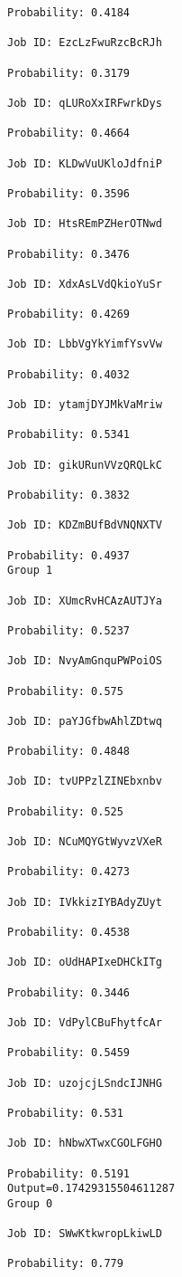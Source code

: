\documentclass[11pt]{article}
\begin{document}
\begin{Verbatim}[commandchars=\\\{\}]
Probability: 0.4184

Job ID: EzcLzFwuRzcBcRJh

Probability: 0.3179

Job ID: qLURoXxIRFwrkDys

Probability: 0.4664

Job ID: KLDwVuUKloJdfniP

Probability: 0.3596

Job ID: HtsREmPZHerOTNwd

Probability: 0.3476

Job ID: XdxAsLVdQkioYuSr

Probability: 0.4269

Job ID: LbbVgYkYimfYsvVw

Probability: 0.4032

Job ID: ytamjDYJMkVaMriw

Probability: 0.5341

Job ID: gikURunVVzQRQLkC

Probability: 0.3832

Job ID: KDZmBUfBdVNQNXTV

Probability: 0.4937
Group 1

Job ID: XUmcRvHCAzAUTJYa

Probability: 0.5237

Job ID: NvyAmGnquPWPoiOS

Probability: 0.575

Job ID: paYJGfbwAhlZDtwq

Probability: 0.4848

Job ID: tvUPPzlZINEbxnbv

Probability: 0.525

Job ID: NCuMQYGtWyvzVXeR

Probability: 0.4273

Job ID: IVkkizIYBAdyZUyt

Probability: 0.4538

Job ID: oUdHAPIxeDHCkITg

Probability: 0.3446

Job ID: VdPylCBuFhytfcAr

Probability: 0.5459

Job ID: uzojcjLSndcIJNHG

Probability: 0.531

Job ID: hNbwXTwxCGOLFGHO

Probability: 0.5191
Output=0.17429315504611287
Group 0

Job ID: SWwKtkwropLkiwLD

Probability: 0.779


\end{Verbatim}
\end{document}
